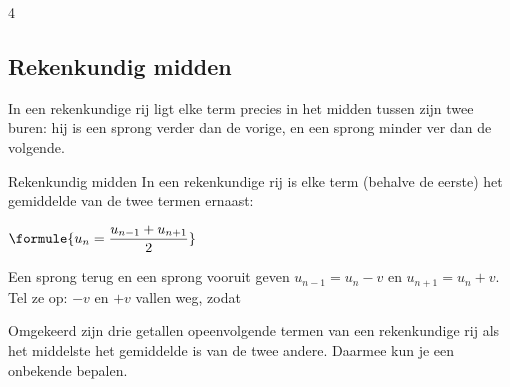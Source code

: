 
\begin{oefeningen}
\end{oefeningen}

\begin{alleenvoor}{4}
\subsection{Rekenkundig midden}

In een rekenkundige rij ligt elke term precies in het midden tussen zijn twee buren: hij is een sprong verder dan de vorige, en een sprong minder ver dan de volgende.

\begin{theorie}
\begin{stelling}{Rekenkundig midden}
In een rekenkundige rij is elke term (behalve de eerste) het gemiddelde van de twee termen ernaast:

\vspace{1mm}
\qquad $\formule{u_n = \dfrac{u_{n-1} + u_{n+1}}{2}}$
\end{stelling}

\begin{bewijs}
Een sprong terug en een sprong vooruit geven $u_{n-1} = u_n - v$ en $u_{n+1} = u_n + v$. Tel ze op: $-v$ en $+v$ vallen weg, zodat
\end{bewijs}
\end{theorie}

Omgekeerd zijn drie getallen opeenvolgende termen van een rekenkundige rij als het middelste het gemiddelde is van de twee andere. Daarmee kun je een onbekende bepalen.


\begin{oefeningen}
\end{oefeningen}

\end{alleenvoor}
